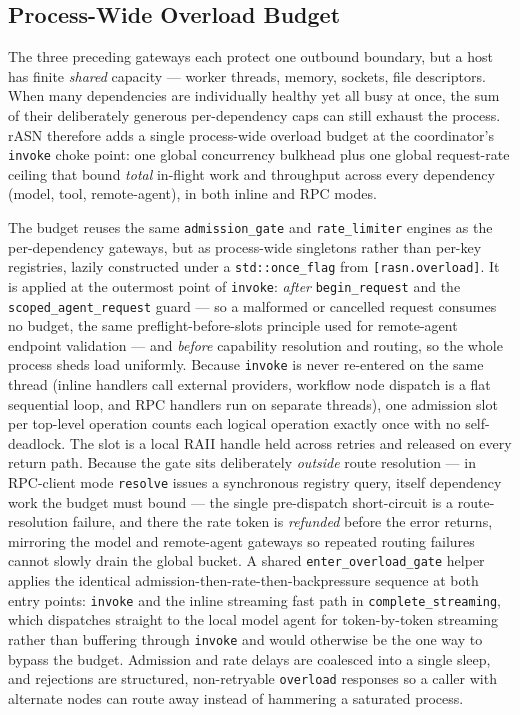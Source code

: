 \documentclass[manuscript,screen,review]{acmart}
\newcommand{\rasn}{rASN\xspace}
\begin{document}
\subsection{Process-Wide Overload Budget}

The three preceding gateways each protect one outbound boundary, but a host has
finite \emph{shared} capacity --- worker threads, memory, sockets, file
descriptors. When many dependencies are individually healthy yet all busy at once,
the sum of their deliberately generous per-dependency caps can still exhaust the
process. \rasn therefore adds a single process-wide overload budget at the
coordinator's \texttt{invoke} choke point: one global concurrency bulkhead plus one
global request-rate ceiling that bound \emph{total} in-flight work and throughput
across every dependency (model, tool, remote-agent), in both inline and RPC modes.

The budget reuses the same \texttt{admission\_gate} and \texttt{rate\_limiter}
engines as the per-dependency gateways, but as process-wide singletons rather than
per-key registries, lazily constructed under a \texttt{std::once\_flag} from
\texttt{[rasn.overload]}. It is applied at the outermost point of \texttt{invoke}:
\emph{after} \texttt{begin\_request} and the \texttt{scoped\_agent\_request} guard
--- so a malformed or cancelled request consumes no budget, the same
preflight-before-slots principle used for remote-agent endpoint validation --- and
\emph{before} capability resolution and routing, so the whole process sheds load
uniformly. Because \texttt{invoke} is never re-entered on the same thread (inline
handlers call external providers, workflow node dispatch is a flat sequential loop,
and RPC handlers run on separate threads), one admission slot per top-level
operation counts each logical operation exactly once with no self-deadlock. The
slot is a local RAII handle held across retries and released on every return path.
Because the gate sits deliberately \emph{outside} route resolution --- in
RPC-client mode \texttt{resolve} issues a synchronous registry query, itself
dependency work the budget must bound --- the single pre-dispatch short-circuit is
a route-resolution failure, and there the rate token is \emph{refunded} before the
error returns, mirroring the model and remote-agent gateways so repeated routing
failures cannot slowly drain the global bucket. A shared
\texttt{enter\_overload\_gate} helper applies the identical
admission-then-rate-then-backpressure sequence at both entry points: \texttt{invoke}
and the inline streaming fast path in \texttt{complete\_streaming}, which dispatches
straight to the local model agent for token-by-token streaming rather than buffering
through \texttt{invoke} and would otherwise be the one way to bypass the budget.
Admission and rate delays are coalesced into
a single sleep, and rejections are structured, non-retryable \texttt{overload}
responses so a caller with alternate nodes can route away instead of hammering a
saturated process.
\end{document}
